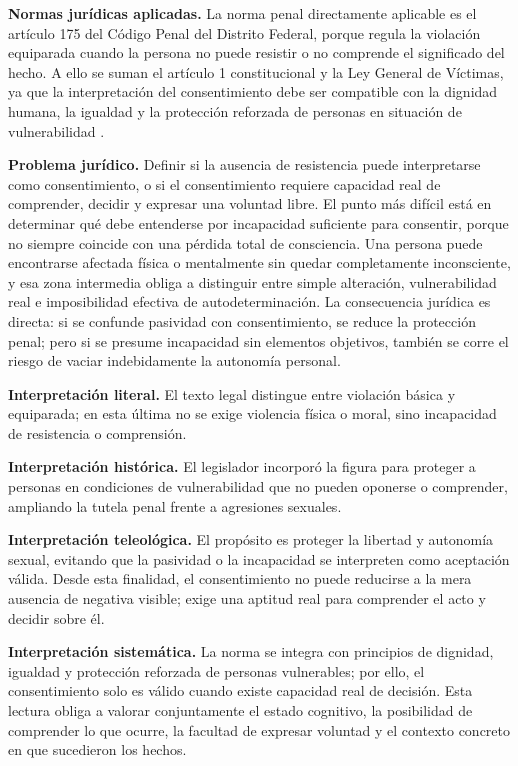 \documentclass[
	spanish,
	letterpaper, oneside
]{article}
\begin{document}
\textbf{Normas jurídicas aplicadas.} La norma penal directamente aplicable es el artículo 175 del Código Penal del Distrito Federal, porque regula la violación equiparada cuando la persona no puede resistir o no comprende el significado del hecho. A ello se suman el artículo 1 constitucional y la Ley General de Víctimas, ya que la interpretación del consentimiento debe ser compatible con la dignidad humana, la igualdad y la protección reforzada de personas en situación de vulnerabilidad \citep{cpeum2026,LeyGeneralVictimas}.

\textbf{Problema jurídico.} Definir si la ausencia de resistencia puede interpretarse como consentimiento, o si el consentimiento requiere capacidad real de comprender, decidir y expresar una voluntad libre. El punto más difícil está en determinar qué debe entenderse por incapacidad suficiente para consentir, porque no siempre coincide con una pérdida total de consciencia. Una persona puede encontrarse afectada física o mentalmente sin quedar completamente inconsciente, y esa zona intermedia obliga a distinguir entre simple alteración, vulnerabilidad real e imposibilidad efectiva de autodeterminación. La consecuencia jurídica es directa: si se confunde pasividad con consentimiento, se reduce la protección penal; pero si se presume incapacidad sin elementos objetivos, también se corre el riesgo de vaciar indebidamente la autonomía personal.

\textbf{Interpretación literal.} El texto legal distingue entre violación básica y equiparada; en esta última no se exige violencia física o moral, sino incapacidad de resistencia o comprensión.

\textbf{Interpretación histórica.} El legislador incorporó la figura para proteger a personas en condiciones de vulnerabilidad que no pueden oponerse o comprender, ampliando la tutela penal frente a agresiones sexuales.

\textbf{Interpretación teleológica.} El propósito es proteger la libertad y autonomía sexual, evitando que la pasividad o la incapacidad se interpreten como aceptación válida. Desde esta finalidad, el consentimiento no puede reducirse a la mera ausencia de negativa visible; exige una aptitud real para comprender el acto y decidir sobre él.

\textbf{Interpretación sistemática.} La norma se integra con principios de dignidad, igualdad y protección reforzada de personas vulnerables; por ello, el consentimiento solo es válido cuando existe capacidad real de decisión. Esta lectura obliga a valorar conjuntamente el estado cognitivo, la posibilidad de comprender lo que ocurre, la facultad de expresar voluntad y el contexto concreto en que sucedieron los hechos.
\end{document}
